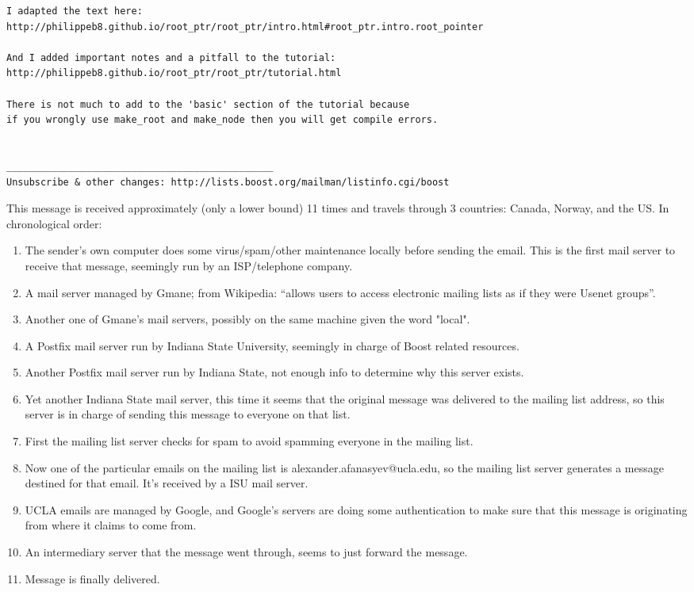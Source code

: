 \documentclass{report}
\begin{document}
\begin{problem}
{\begin{lstlisting}
I adapted the text here:
http://philippeb8.github.io/root_ptr/root_ptr/intro.html#root_ptr.intro.root_pointer

And I added important notes and a pitfall to the tutorial:
http://philippeb8.github.io/root_ptr/root_ptr/tutorial.html

There is not much to add to the 'basic' section of the tutorial because
if you wrongly use make_root and make_node then you will get compile errors.


_______________________________________________
Unsubscribe & other changes: http://lists.boost.org/mailman/listinfo.cgi/boost
\end{lstlisting}
}

\begin{answer}{30em}
  This message is received approximately (only a lower bound) 11 times and travels
  through 3 countries: Canada, Norway, and the US.
  In chronological order:
  \begin{enumerate}
    \item
      The sender's own computer does some virus/spam/other
      maintenance locally before sending the email. This is the first mail server
      to receive that message, seemingly run by an ISP/telephone company.
    \item
      A mail server managed by Gmane; from Wikipedia: ``allows users to access
      electronic mailing lists as if they were Usenet groups''.
    \item
      Another one of Gmane's mail servers, possibly on the same machine given
      the word "local".
    \item
      A Postfix mail server run by Indiana State University, seemingly
      in charge of Boost related resources.
    \item
      Another Postfix mail server run by Indiana State, not enough info
      to determine why this server exists.
    \item
      Yet another Indiana State mail server, this time it seems that the
      original message was delivered to the mailing list address,
      so this server is in charge of sending this message to everyone on that
      list.
    \item
      First the mailing list server checks for spam to avoid spamming everyone
      in the mailing list.
    \item
      Now one of the particular emails on the mailing list is
      alexander.afanasyev@ucla.edu, so the mailing list server generates
      a message destined for that email. It's received by a ISU mail server.
    \item
      UCLA emails are managed by Google, and Google's servers are doing some
      authentication to make sure that this message is originating from where it
      claims to come from.
    \item
      An intermediary server that the message went through, seems to just
      forward the message.
    \item
      Message is finally delivered.
  \end{enumerate}
\end{answer}

\end{problem}
\end{document}
